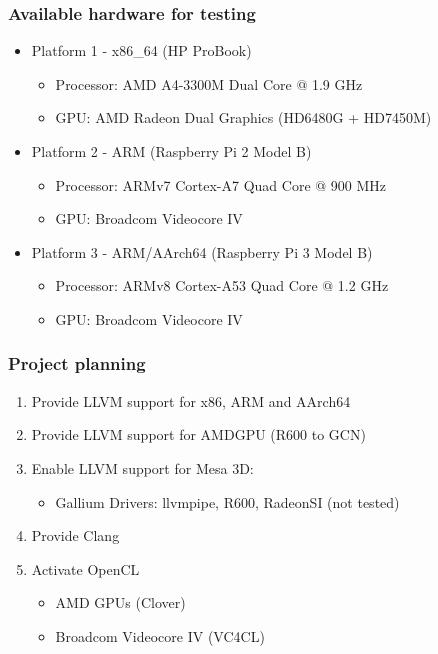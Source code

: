 \documentclass{beamer}
\begin{document}
\begin{frame}
\frametitle{Available hardware for testing}
\begin{itemize}
  \item Platform 1 - x86\_64 (HP ProBook)
  \begin{itemize}
    \item Processor: AMD A4-3300M Dual Core @ 1.9 GHz
    \item GPU: AMD Radeon Dual Graphics (HD6480G + HD7450M)
  \end{itemize}
  \item Platform 2 - ARM (Raspberry Pi 2 Model B)
  \begin{itemize}
    \item Processor: ARMv7 Cortex-A7 Quad Core @ 900 MHz
    \item GPU: Broadcom Videocore IV
  \end{itemize}
  \item Platform 3 - ARM/AArch64 (Raspberry Pi 3 Model B)
  \begin{itemize}
    \item Processor: ARMv8 Cortex-A53 Quad Core @ 1.2 GHz
    \item GPU: Broadcom Videocore IV
  \end{itemize}
\end{itemize}
\end{frame}

\begin{frame}
\frametitle{Project planning}
\begin{enumerate}
  \item Provide LLVM support for x86, ARM and AArch64
  \item Provide LLVM support for AMDGPU (R600 to GCN)
  \item Enable LLVM support for Mesa 3D:
    \begin{itemize}
      \item Gallium Drivers: llvmpipe, R600, RadeonSI (not tested)
    \end{itemize}
  \item Provide Clang
  \item Activate OpenCL
  \begin{itemize}
    \item AMD GPUs (Clover)
    \item Broadcom Videocore IV (VC4CL)
  \end{itemize}
\end{enumerate}
\end{frame}
\end{document}
